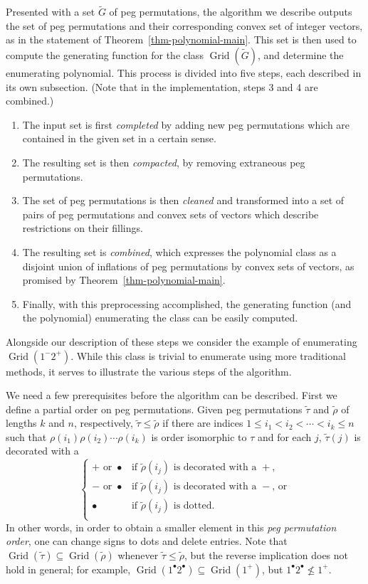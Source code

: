 \documentclass[10pt]{article}
\theoremstyle{plain}
\theoremstyle{definition}
\newcommand{\Grid}{\operatorname{Grid}}
\newcommand{\p}[1]{#1^+}
\newcommand{\m}[1]{#1^-}
\renewcommand{\d}[1]{#1^{\bullet}}
\begin{document}
Presented with a set $\tilde{G}$ of peg permutations, the algorithm we describe outputs the
set of peg permutations and their corresponding convex set of integer vectors, as in the statement of Theorem~\ref{thm-polynomial-main}. This set is then used to compute the generating function for the class $\Grid\left(\tilde{G}\right)$, and determine the enumerating polynomial. 
This process is divided into five steps, each described in its own subsection. (Note that in the implementation, steps 3 and 4 are combined.)

\begin{enumerate}[1.]
\item The input set is first \emph{completed} by adding new peg permutations which are contained in the given set in a certain sense. 
\item The resulting set is then \emph{compacted}, by removing extraneous peg permutations. 
\item The set of peg permutations is then \emph{cleaned} and transformed into a set of pairs of peg permutations and convex sets of vectors which describe restrictions on their fillings. 
\item The resulting set is \emph{combined}, which expresses the polynomial class as a disjoint union of inflations of peg permutations by convex sets of vectors, as promised by Theorem~\ref{thm-polynomial-main}.
\item Finally, with this preprocessing accomplished, the generating function (and the polynomial) enumerating the class can be easily computed.
\end{enumerate}

Alongside our description of these steps we consider the example of enumerating $\Grid(\m 1\p 2)$. While this class is trivial to enumerate using more traditional methods, it serves to illustrate the various steps of the algorithm.

We need a few prerequisites before the algorithm can be described. First we define a partial order on peg permutations. Given peg permutations $\tilde{\tau}$ and $\tilde{\rho}$ of lengths $k$ and $n$, respectively, $\tilde{\tau}\le\tilde{\rho}$ if there are indices $1\le i_1<i_2<\cdots<i_k\le n$ such that $\rho(i_1)\rho(i_2)\cdots\rho(i_k)$ is order isomorphic to $\tau$ and for each $j$, $\tilde{\tau}(j)$ is decorated with a
\[
\left\{
\begin{array}{cl}
\text{$+$ or $\bullet$}&\text{if $\tilde{\rho}(i_j)$ is decorated with a $+$,}\\
\text{$-$ or $\bullet$}&\text{if $\tilde{\rho}(i_j)$ is decorated with a $-$, 
or}\\
\text{$\bullet$}&\text{if $\tilde{\rho}(i_j)$ is dotted.}\\
\end{array}
\right.
\]
In other words, in order to obtain a smaller element in this \emph{peg permutation order}, one can change signs to dots and delete entries. Note that $\Grid(\tilde{\tau})\subseteq\Grid(\tilde{\rho})$ whenever $\tilde{\tau}\le\tilde{\rho}$, but the reverse implication does not hold in general; for example, $\Grid(\d{1}\d{2})\subseteq\Grid(\p{1})$, but $\d{1}\d{2} \not\le \p{1}$.
\end{document}
